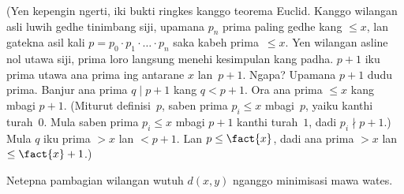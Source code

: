\documentclass[../../../include/open-logic-section]{subfiles}
\begin{document}
(Yen kepengin ngerti, iki bukti ringkes kanggo
teorema Euclid. Kanggo wilangan asli luwih gedhe
tinimbang siji, upamana $p_n$ prima paling gedhe
kang $\le x$, lan gatekna asil kali $p =
p_0\cdot p_1 \cdot \dots \cdot p_n$ saka kabeh
prima~$\le x$. Yen wilangan asline nol utawa siji,
prima loro langsung menehi kesimpulan kang padha.
%
%
$p+1$ iku prima utawa ana prima ing antarane
$x$ lan~$p+1$. Ngapa? Upamana $p+1$ dudu prima.
Banjur ana prima $q \mid p+1$ kang $q < p+1$.
Ora ana prima $\le x$ kang mbagi $p+1$. (Miturut
definisi~$p$, saben prima $p_i \le x$ mbagi~$p$,
yaiku kanthi turah~$0$. Mula saben prima $p_i \le x$
mbagi $p+1$ kanthi turah~$1$, dadi $p_i \nmid p+1$.)
Mula $q$ iku prima $> x$ lan $< p+1$. Lan
$p \le \fact{x}$, dadi ana prima $> x$ lan
$\le \fact{x}+1$.)

\begin{prob}
Netepna pambagian wilangan wutuh $d(x, y)$ nganggo
minimisasi mawa wates.
\end{prob}
\end{document}
